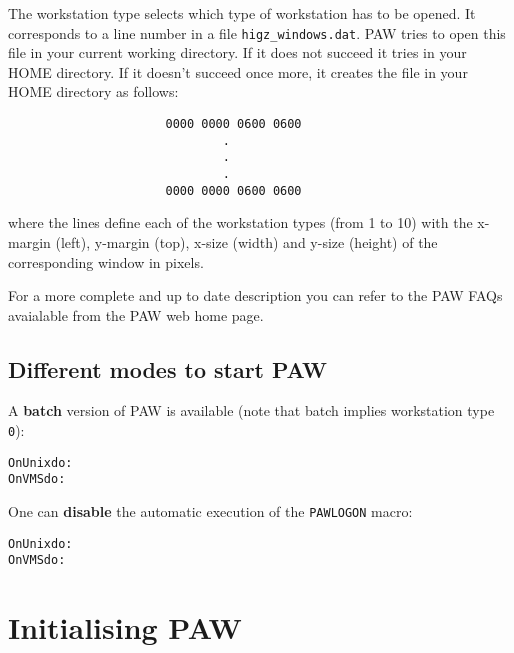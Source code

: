 The workstation type selects which type of workstation has to be opened. 
It corresponds to a line number in a file \texttt{higz_windows.dat}.
PAW tries to open this file in your current working directory.
If it does not succeed it tries in your HOME directory.
If it doesn't succeed once more, it creates the file in your HOME directory 
as follows:
\begin{verbatim}
                      0000 0000 0600 0600
                              .
                              .
                              .
                      0000 0000 0600 0600
\end{verbatim}
where the lines define each of the workstation types (from 1 to 10) with
the x-margin (left), y-margin (top), x-size (width) and y-size (height) of the
corresponding window in pixels.

For a more complete and up to date description you can refer to the PAW FAQs 
avaialable from the PAW web home page.

\subsection{Different modes to start PAW}

\begin{UL}
\item A {\bf batch} version of PAW is available 
      (note that batch implies workstation type \texttt{0}):
\begin{alltt}
 On Unix   do:  
 On VMS    do:  
\end{alltt}
\item One can {\bf disable} the automatic execution 
      of the \texttt{PAWLOGON} macro:
\begin{alltt}
 On Unix   do:  
 On VMS    do:  
\end{alltt}
\end{UL}

\section{Initialising PAW}
\label{sec:INITIAL}
 
